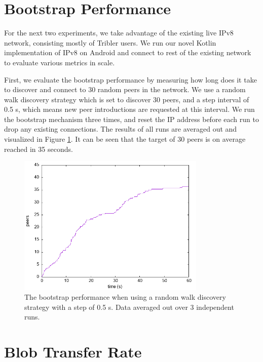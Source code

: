 \section{Bootstrap Performance}

For the next two experiments, we take advantage of the existing live IPv8 network, consisting mostly of Tribler users. We run our novel Kotlin implementation of IPv8 on Android and connect to rest of the existing network to evaluate various metrics in scale.

First, we evaluate the bootstrap performance by measuring how long does it take to discover and connect to 30 random peers in the network. We use a random walk discovery strategy which is set to discover 30 peers, and a step interval of 0.5 s, which means new peer introductions are requested at this interval. We run the bootstrap mechanism three times, and reset the IP address before each run to drop any existing connections. The results of all runs are averaged out and visualized in Figure \ref{bootstrap_performance}. It can be seen that the target of 30 peers is on average reached in 35 seconds.

\begin{figure}[h!]
    \centering
    \includegraphics[width=0.8\textwidth]{plots/bootstrap}
    \caption{The bootstrap performance when using a random walk discovery strategy with a step of 0.5 s. Data averaged out over 3 independent runs.}
    \label{bootstrap_performance}
\end{figure}

\section{Blob Transfer Rate}

